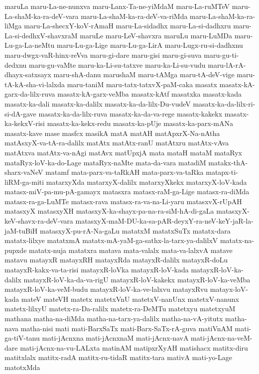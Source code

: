 {maruLa
maru-La-ne-nunxva
maru-Lanx-Ta-ne-yiMdaM
maru-La-ruMTeV
maru-La-shaM-ka-ra-deV-vara
maru-La-shaM-ka-ra-deV-va-riMda
maru-La-shaM-ka-ra-liMga
maru-La-shecxY-koV-rAmaH
maru-La-sidadhx
maru-La-si-dadhxru
maru-La-si-dedhxV-shavxraM
maruLe
maru-LeV-shavxra
maruLu
maru-LuMDa
maru-Lu-ga-La-neMtu
maru-Lu-ga-Lige
maru-Lu-ga-LirA
maru-Lugx-ru-si-dadhxnu
maru-dwgx-vaR-hinx-reVva
maru-gi-dare
maru-gisi
maru-gi-suva
maru-gu-ti-dedxnu
maru-gu-vaMte
maru-ka-Li-su-tatxve
maru-ka-Li-su-vudu
maru-lA-rA-dhayx-satxsayx
maru-shA-danu
marushaM
maru-tAMga
maru-tA-deV-vige
maru-tA-kA-sha-vi-lalxda
maru-taniM
maru-tatx-tatxvX-paM-caka
masatx
masatx-kA-garx-da-lilx-ruva
masatx-kA-garx-veMba
masatx-kAtf
masatxka
masatx-kada
masatx-ka-dali
masatx-ka-dalilx
masatx-ka-da-lilx-Du-vudeV
masatx-ka-da-lilx-ri-si-dA-gave
masatx-ka-da-lilx-ruva
masatx-ka-da-va-rege
masatx-kakekx
masatx-ka-kekxV-risi
masatx-ka-kekx-redu
masatx-ka-pUje
masatx-ka-parx-mANa
masatx-kave
mase
masfcx
masikA
matA
matAH
matApxrX-Na-nAtha
matAsxyX-va-tA-ra-dalilx
matAtx
matAtx-ranU
matAtxru
matAtx-vAva
matAtxva
matAtx-va-nAgi
matAvx
matUpxjA
mata
mataH
mataM
mataRyx
mataRyx-loV-ka-do-Lage
mataRyx-naMte
mata-da-vara
matadiM
matakx-thA-sharx-vaNeV
matamf
mata-parx-va-taRkAH
mata-parx-va-taRka
matapx-ti-liRM-ga-miti
matarxyXda
matarxyX-dalilx
matarxyXkekx
matarxyX-loV-kada
matasx-miV-pa-mu-pA-gamayx
matasxra
matasx-raM-ga-Lige
matasx-ra-diMda
matasx-ra-ga-LuMTe
matasx-rava
matasx-ra-va-na-Li-yaru
matasxvX-rUpAH
matasxyX
matasxyXH
matasxyX-ka-shayx-pa-na-ra-siM-hA-di-gaLa
matasxyX-keV-shavx-ra-deV-vara
matasxyX-maM-DU-ka-sa-pAR-deyxY-ra-neV-keY-jaR-la-jaM-tuBiH
matasxyX-pu-rA-Na-gaLu
matatxM
matatxSuTx
matatx-dara
matatx-lilxye
matatxmA
matatx-mA-yaM-ga-sathx-la-tarx-ya-dalilxV
matatx-na-pupxde
matatx-nuja
matatxra
matava
mata-valalx
mata-va-lalxvA
matave
matavu
matayxR
matayxRH
matayxRda
matayxR-dalilx
matayxR-doLu
matayxR-kakx-va-ta-risi
matayxR-loVka
matayxR-loV-kada
matayxR-loV-ka-dalilx
matayxR-loV-ka-da-va-rigU
matayxR-loV-kakekx
matayxR-loV-ka-veMba
matayxR-loV-ka-veM-budu
matayxR-loV-ka-ve-lalxvu
matayxRvu
matayx-loV-kada
mateV
mateVH
matetx
matetxVnU
matetxV-nanUnx
matetxV-nanunx
matetx-lilxyU
matetx-ra-Da-ralilx
matetx-ra-DeMTu
matetxyu
matetxyuM
mathana
matha-na-diMda
matha-na-tarx-ya-dalilx
matha-na-vA-yitutx
matha-nava
matha-nisi
mati
mati-BarxSaTx
mati-Barx-SaTx-rA-guva
matiVnAM
mati-ga-tiV-tanu
mati-jAcnxna
mati-jAcnxnaM
mati-jAcnx-navA
mati-jAcnx-na-veM-dare
mati-jAcnx-na-vu-LALxta
matinAM
matipxrXyAH
matishacx
matitx-diru
matitxlalx
matitx-radA
matitx-ru-tidaR
matitx-tara
mativA
mati-yo-Lage
matotxMda
}
